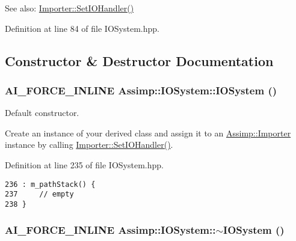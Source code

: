 \begin{Desc}
\item[See also:]\hyperlink{class_assimp_1_1_importer_1161f46318af18bb86dfe0fc3edea4df}{Importer::SetIOHandler()} \end{Desc}


Definition at line 84 of file IOSystem.hpp.

\subsection{Constructor \& Destructor Documentation}
\hypertarget{class_assimp_1_1_i_o_system_f8ba1ee2dc0686da8fc9e3dad49af801}{
\subsubsection[IOSystem]{\setlength{\rightskip}{0pt plus 5cm}AI\_\-FORCE\_\-INLINE Assimp::IOSystem::IOSystem ()}}
\label{class_assimp_1_1_i_o_system_f8ba1ee2dc0686da8fc9e3dad49af801}


Default constructor. 

Create an instance of your derived class and assign it to an \hyperlink{class_assimp_1_1_importer}{Assimp::Importer} instance by calling \hyperlink{class_assimp_1_1_importer_1161f46318af18bb86dfe0fc3edea4df}{Importer::SetIOHandler()}. 

Definition at line 235 of file IOSystem.hpp.

\begin{Code}\begin{verbatim}236 : m_pathStack() {
237     // empty
238 }
\end{verbatim}
\end{Code}


\hypertarget{class_assimp_1_1_i_o_system_617417f1c5125770606fea3b41068b36}{
\subsubsection[$\sim$IOSystem]{\setlength{\rightskip}{0pt plus 5cm}AI\_\-FORCE\_\-INLINE Assimp::IOSystem::$\sim$IOSystem ()}}
\label{class_assimp_1_1_i_o_system_617417f1c5125770606fea3b41068b36}


